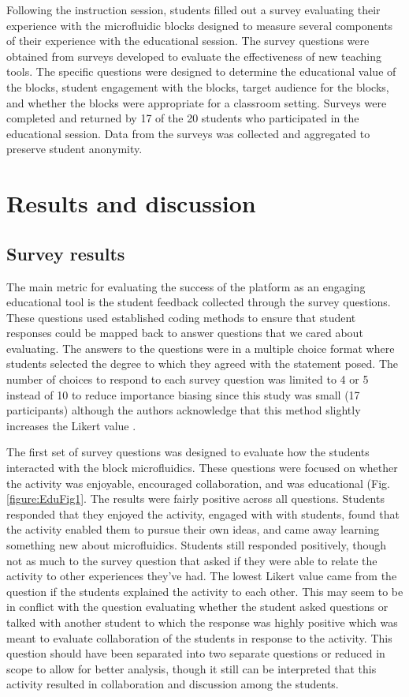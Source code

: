 Following the instruction session, students filled out a survey evaluating their experience with the microfluidic blocks designed to measure several components of their experience with the educational session. The survey questions were obtained from surveys developed to evaluate the effectiveness of new teaching tools. The specific questions were designed to determine the educational value of the blocks, student engagement with the blocks, target audience for the blocks, and whether the blocks were appropriate for a classroom setting. Surveys were completed and returned by 17 of the 20 students who participated in the educational session. Data from the surveys was collected and aggregated to preserve student anonymity.

\section{Results and discussion}

\subsection{Survey results}
The main metric for evaluating the success of the platform as an engaging educational tool is the student feedback collected through the survey questions. These questions used established coding methods to ensure that student responses could be mapped back to answer questions that we cared about evaluating. The answers to the questions were in a multiple choice format where students selected the degree to which they agreed with the statement posed. The number of choices to respond to each survey question was limited to 4 or 5 instead of 10 to reduce importance biasing since this study was small (17 participants) although the authors acknowledge that this method slightly increases the Likert value \cite{ISI:000252619600006, ARMSTRONG1987, matell1971there}.

The first set of survey questions was designed to evaluate how the students interacted with the block microfluidics. These questions were focused on whether the activity was enjoyable, encouraged collaboration, and was educational (Fig. \ref{figure:EduFig1}. The results were fairly positive across all questions. Students responded that they enjoyed the activity, engaged with with students, found that the activity enabled them to pursue their own ideas, and came away learning something new about microfluidics. Students still responded positively, though not as much to the survey question that asked if they were able to relate the activity to other experiences they've had. The lowest Likert value came from the question if the students explained the activity to each other. This may seem to be in conflict with the question evaluating whether the student asked questions or talked with another student to which the response was highly positive which was meant to evaluate collaboration of the students in response to the activity. This question should have been separated into two separate questions or reduced in scope to allow for better analysis, though it still can be interpreted that this activity resulted in collaboration and discussion among the students. 

